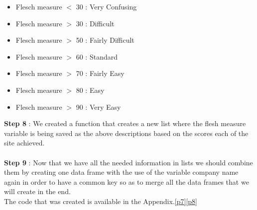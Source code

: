 \documentclass{book}
\begin{document}
\begin{itemize}
\item Flesch measure $<$ 30 : Very Confusing
\item Flesch measure $>$ 30 : Difficult
\item Flesch measure $>$ 50 : Fairly Difficult
\item Flesch measure $>$ 60 : Standard
\item Flesch measure $>$ 70 : Fairly Easy
\item Flesch measure $>$ 80 : Easy
\item Flesch measure $>$ 90 : Very Easy
\end{itemize}
\textbf{Step 8} : We created a function that creates a new list where the flesh measure variable is being saved as the above descriptions based on the scores each of the site achieved.\\\\
\textbf{Step 9} : Now that we have all the needed information in lists we should combine them by creating one data frame with the use of the variable company name again in order to have a common key so as to merge all the data frames that we will create in the end.\\
The code that was created is available in the Appendix.\ref{p7}\ref{p8}
\end{document}
